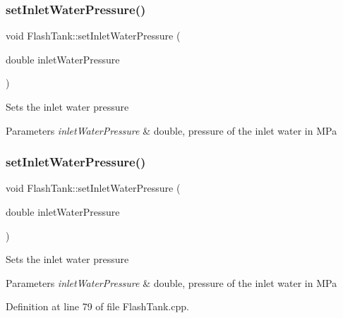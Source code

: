\subsubsection{\texorpdfstring{set\+Inlet\+Water\+Pressure()}{setInletWaterPressure()}\hspace{0.1cm}{\footnotesize\ttfamily [1/3]}}
{\footnotesize\ttfamily void Flash\+Tank\+::set\+Inlet\+Water\+Pressure (\begin{DoxyParamCaption}\item[{double}]{inlet\+Water\+Pressure }\end{DoxyParamCaption})}

Sets the inlet water pressure 
\begin{DoxyParams}{Parameters}
{\em inlet\+Water\+Pressure} & double, pressure of the inlet water in M\+Pa \\
\hline
\end{DoxyParams}
\mbox{\label{class_flash_tank_aed0991a7902401d110fb2f4b472326f5}} 
\subsubsection{\texorpdfstring{set\+Inlet\+Water\+Pressure()}{setInletWaterPressure()}\hspace{0.1cm}{\footnotesize\ttfamily [2/3]}}
{\footnotesize\ttfamily void Flash\+Tank\+::set\+Inlet\+Water\+Pressure (\begin{DoxyParamCaption}\item[{double}]{inlet\+Water\+Pressure }\end{DoxyParamCaption})}

Sets the inlet water pressure 
\begin{DoxyParams}{Parameters}
{\em inlet\+Water\+Pressure} & double, pressure of the inlet water in M\+Pa \\
\hline
\end{DoxyParams}


Definition at line 79 of file Flash\+Tank.\+cpp.

\mbox{\label{class_flash_tank_aed0991a7902401d110fb2f4b472326f5}} 
